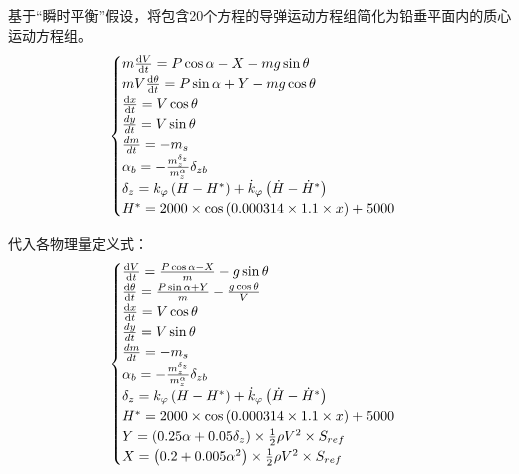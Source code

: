 \documentclass[UTF8]{ctexart}
\begin{document}
基于“瞬时平衡”假设，将包含20个方程的导弹运动方程组简化为铅垂平面内的质心运动方程组。
\begin{align}
    \begin{cases}
        m\frac{\mathrm{d}V}{\mathrm{d}t}=P\cos\alpha-X-mg\sin\theta\hfill                                     \\
        mV\frac{\mathrm{d}\theta}{\mathrm{d}t}=P\sin\alpha+Y-mg\cos\theta\hfill                               \\
        \frac{\mathrm{d}x}{\mathrm{d}t}=V\cos\theta \hfill                                                    \\
        \frac{dy}{dt}=V\sin\theta \hfill                                                                      \\
        \frac{dm}{dt}=-m_{s} \hfill                                                                           \\
        \alpha_b=-\frac{m_{z}^{\delta_z}}{m_{z}^{\alpha}}\delta_{zb} \hfill                                   \\
        \delta_z = k_\varphi \left(H-H^{*}\right) +\dot{k}_{\varphi} \left(\dot{H} -\dot{H}^{*}\right) \hfill \\
        H^{*}=2000\times \cos\left(0.000314\times1.1\times x\right)+5000\hfill
    \end{cases}
\end{align}

代入各物理量定义式：
\begin{align}
    \begin{cases}
        \frac{\mathrm{d}V}{\mathrm{d}t}=\frac{P\cos\alpha-X}{m}-g\sin\theta\hfill                             \\
        \frac{\mathrm{d}\theta}{\mathrm{d}t}=\frac{P\sin\alpha+Y}{m}-\frac{g\cos\theta}{V}\hfill              \\
        \frac{\mathrm{d}x}{\mathrm{d}t}=V\cos\theta \hfill                                                    \\
        \frac{dy}{dt}=V\sin\theta \hfill                                                                      \\
        \frac{dm}{dt}=-m_{s} \hfill                                                                           \\
        \alpha_b=-\frac{m_{z}^{\delta_z}}{m_{z}^{\alpha}}\delta_{zb} \hfill                                   \\
        \delta_z = k_\varphi \left(H-H^{*}\right) +\dot{k}_{\varphi} \left(\dot{H} -\dot{H}^{*}\right) \hfill \\
        H^{*}=2000\times \cos\left(0.000314\times1.1\times x\right)+5000\hfill                                \\
        Y=\left(0.25\alpha+0.05\delta_{z}\right)\times \frac{1}{2}\rho V^{2} \times S_{ref}                   \\
        X=\left(0.2+0.005\alpha^2\right)\times \frac{1}{2}\rho V^{2} \times S_{ref}
    \end{cases}
\end{align}
\end{document}
